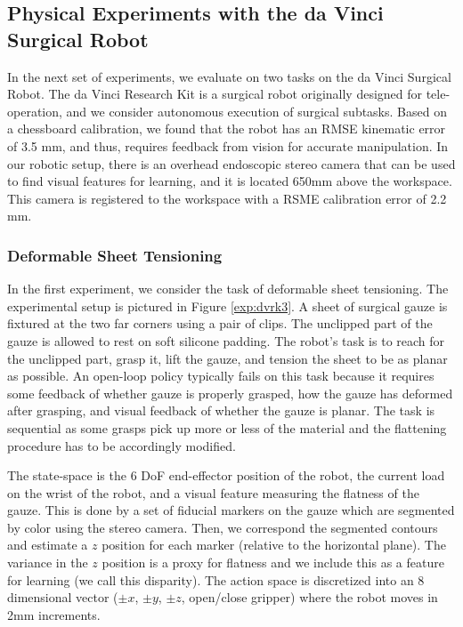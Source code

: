 \subsection{Physical Experiments with the da Vinci Surgical Robot}
In the next set of experiments, we evaluate \hirl on two tasks on the da Vinci Surgical Robot.
The da Vinci Research Kit is a surgical robot originally designed for tele-operation, and we consider autonomous execution of surgical subtasks.
Based on a chessboard calibration, we found that the robot has an RMSE kinematic error of 3.5 mm, and thus, requires feedback from vision for accurate manipulation. 
In our robotic setup, there is an overhead endoscopic stereo camera that can be used to find visual features for learning, and it is located 650mm above the workspace.
This camera is registered to the workspace with a RSME calibration error of 2.2 mm.

\subsubsection{Deformable Sheet Tensioning} In the first experiment, we consider the task of deformable sheet tensioning. The experimental setup is pictured in Figure \ref{exp:dvrk3}. A sheet of surgical gauze is fixtured at the two far corners using a pair of clips. The unclipped part of the gauze is allowed to rest on soft silicone padding. The robot's task is to reach for the unclipped part, grasp it, lift the gauze, and tension the sheet to be as planar as possible.
An open-loop policy typically fails on this task because it requires some feedback of whether gauze is properly grasped, how the gauze has deformed after grasping, and visual feedback of whether the gauze is planar.
The task is sequential as some grasps pick up more or less of the material and the flattening procedure has to be accordingly modified.

The state-space is the 6 DoF end-effector position of the robot, the current load on the wrist of the robot, and a visual feature measuring the flatness of the gauze.
This is done by a set of fiducial markers on the gauze which are segmented by color using the stereo camera.
Then, we correspond the segmented contours and estimate a $z$ position for each marker (relative to the horizontal plane).
The variance in the $z$ position is a proxy for flatness and we include this as a feature for learning (we call this disparity).
The action space is discretized into an 8 dimensional vector ($\pm x$, $\pm y$, $\pm z$, open/close gripper) where the robot moves in 2mm increments.


